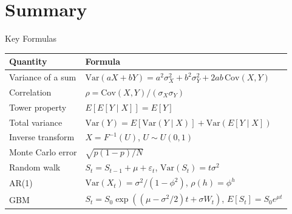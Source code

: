 \section{Summary}

\begin{frame}{Key Formulas}
\itemsize{\small}
\begin{center}
\footnotesize
\begin{tabular}{ll}
\toprule
\textbf{Quantity} & \textbf{Formula} \\
\midrule
Variance of a sum & $\text{Var}(aX + bY) = a^2\sigma_X^2 + b^2\sigma_Y^2 + 2ab\,\text{Cov}(X, Y)$ \\
Correlation & $\rho = \text{Cov}(X, Y)/(\sigma_X\sigma_Y)$ \\
Tower property & $E[E[Y \mid X]] = E[Y]$ \\
Total variance & $\text{Var}(Y) = E[\text{Var}(Y \mid X)] + \text{Var}(E[Y \mid X])$ \\
Inverse transform & $X = F^{-1}(U)$, $U \sim U(0, 1)$ \\
Monte Carlo error & $\sqrt{p(1 - p)/N}$ \\
Random walk & $S_t = S_{t-1} + \mu + \varepsilon_t$, $\text{Var}(S_t) = t\sigma^2$ \\
AR(1) & $\text{Var}(X_t) = \sigma^2/(1 - \phi^2)$, $\rho(h) = \phi^h$ \\
GBM & $S_t = S_0\exp((\mu - \sigma^2/2)t + \sigma W_t)$, $E[S_t] = S_0e^{\mu t}$ \\
\bottomrule
\end{tabular}
\end{center}
\end{frame}

